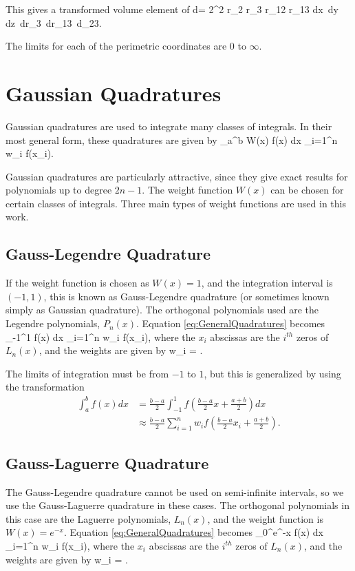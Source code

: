 \documentclass[Dissertation.tex]{subfiles}
\begin{document}
\noindent This gives a transformed volume element of
\beq
\label{eq:PerimetricVolEl}
d\tau = 2\pi^2 r_2 r_3 r_{12} r_{13} dx\, dy\, dz\, dr_3\, dr_{13}\, d\phi_{23}.
\eeq

\noindent The limits for each of the perimetric coordinates are 0 to $\infty$.


\section{Gaussian Quadratures}
\label{sec:GaussQuad}
Gaussian quadratures are used to integrate many classes of integrals.  In their most general form, these quadratures are given by
\beq
\label{eq:GeneralQuadratures}
\int_a^b W(x) f(x) dx \approx \sum_{i=1}^n w_i f(x_i).
\eeq

\noindent Gaussian quadratures are particularly attractive, since they give exact results for polynomials up to degree $2n-1$.  The weight function $W(x)$ can be chosen for certain classes of integrals.  Three main types of weight functions are used in this work.


\subsection{Gauss-Legendre Quadrature}
\label{sec:GaussLegendre}
If the weight function is chosen as $W(x)=1$, and the integration interval is $(-1,1)$, this is known as Gauss-Legendre quadrature (or sometimes known simply as Gaussian quadrature).  The orthogonal polynomials used are the Legendre polynomials, $P_n(x)$.  Equation \ref{eq:GeneralQuadratures} becomes
\beq
\label{eq:GaussLeg}
\int_{-1}^1 f(x) dx \approx \sum_{i=1}^n w_i f(x_i),
\eeq
where the $x_i$ abscissas are the $i^{th}$ zeros of $L_n(x)$, and the weights are given by
\beq
\label{eq:GaussLegWeights}
w_i = .
\eeq

The limits of integration must be from $-1$ to $1$, but this is generalized by using the transformation \cite{Abramowitz1965}
\begin{align}
\label{eq:GaussLegGen}
\int_a^b f(x) dx &= \frac{b-a}{2} \int_{-1}^1 f \left(\frac{b-a}{2} x + \frac{a+b}{2}\right) dx \\
&\approx \frac{b-a}{2} \sum_{i=1}^n w_i f \left(\frac{b-a}{2} x_i + \frac{a+b}{2}\right).
\end{align}


\subsection{Gauss-Laguerre Quadrature}
\label{sec:GaussLag}
The Gauss-Legendre quadrature cannot be used on semi-infinite intervals, so we use the Gauss-Laguerre quadrature in these cases.  The orthogonal polynomials in this case are the Laguerre polynomials, $L_n(x)$, and the weight function is $W(x) = e^{-x}$.  Equation \ref{eq:GeneralQuadratures} becomes
\beq
\label{eq:GaussLag}
\int_0^\infty e^{-x} f(x) dx \approx \sum_{i=1}^n w_i f(x_i),
\eeq
where the $x_i$ abscissas are the $i^{th}$ zeros of $L_n(x)$, and the weights are given by
\beq
\label{eq:GaussLagWeights}
w_i = .
\eeq
\end{document}
